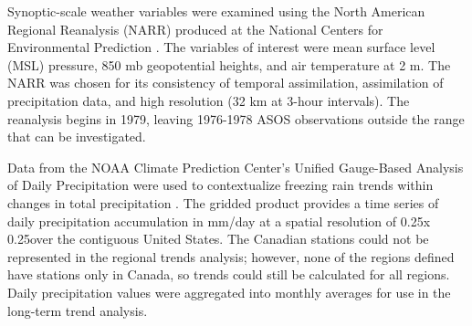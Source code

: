 \documentclass[twocol]{ametsoc}
\begin{document}
Synoptic-scale weather variables were examined using the North American Regional Reanalysis (NARR) produced at the National Centers for Environmental Prediction \citep{mesinger2006north}. The variables of interest were mean surface level (MSL) pressure, 850 mb geopotential heights, and air temperature at 2 m. The NARR was chosen for its consistency of temporal assimilation, assimilation of precipitation data, and high resolution (32 km at 3-hour intervals). The reanalysis begins in 1979, leaving 1976-1978 ASOS observations outside the range that can be investigated.

Data from the NOAA Climate Prediction Center's Unified Gauge-Based Analysis of Daily Precipitation were used to contextualize freezing rain trends within changes in total precipitation \citep{xie2010cpc,xie2007gauge,chen2008assessing}. The gridded product provides a time series of daily precipitation accumulation in mm/day at a spatial resolution of 0.25\degree x 0.25\degree over the contiguous United States. The Canadian stations could not be represented in the regional trends analysis; however, none of the regions defined have stations only in Canada, so trends could still be calculated for all regions. Daily precipitation values were aggregated into monthly averages for use in the long-term trend analysis.
\end{document}
